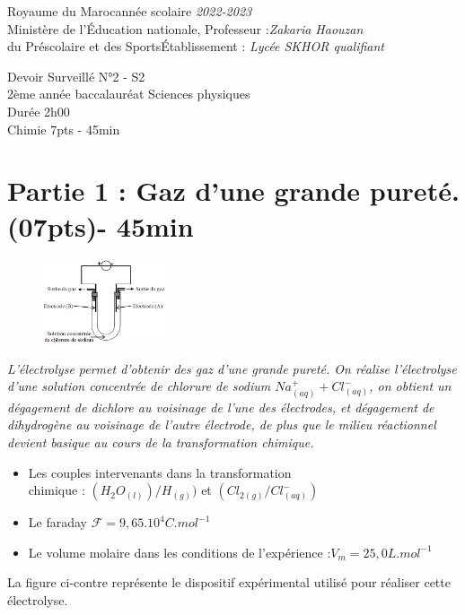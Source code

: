 \documentclass[12pt]{article}
\newcommand\headerMe[2]{\noindent{}#1\hfill#2}
\begin{document}
\headerMe{Royaume du Maroc}{année scolaire \emph{2022-2023}}\\
\headerMe{Ministère de l'Éducation nationale, }{  Professeur :\emph{Zakaria Haouzan}}\\
\headerMe{du Préscolaire et des Sports}{Établissement : \emph{Lycée SKHOR qualifiant}}\\
\begin{center}
Devoir Surveillé  N°2 - S2 \\
    2ème année baccalauréat Sciences physiques\\
Durée 2h00
\\
    \vspace{.2cm}
\hrulefill
\Large{Chimie 7pts - 45min}
\hrulefill\\

\end{center}

 \section*{Partie 1 : Gaz d’une grande pureté. \dotfill(07pts)- 45min }
\begin{figure}
  \begin{center}
	  \vspace{-0.6cm}
	\includegraphics[width=0.32\textwidth]{./img/ex00.png}
  \end{center}
\end{figure}
	   \emph{L'électrolyse permet d'obtenir des gaz d'une grande pureté.
On réalise l'électrolyse d'une solution concentrée de chlorure de sodium
$Na^+_{(aq)} + Cl^-_{(aq)}$, on obtient un dégagement de dichlore au voisinage de l’une des
électrodes, et dégagement de dihydrogène au voisinage de l'autre électrode, de plus
que le milieu réactionnel \\devient basique au cours de la transformation chimique.}

\begin{itemize}
	\item Les couples intervenants dans la transformation\\ chimique : $(H_2O_{(l)})/H_{(g)})$ et $(Cl_{2(g)}/Cl^-_{(aq)})$
	\item Le faraday $\mathscr{F}=9,65.10^4 C.mol^{-1}$
	\item Le volume molaire dans les conditions de l’expérience :$V_m = 25,0L.mol^{-1}$
\end{itemize}
La figure ci-contre représente le
dispositif expérimental utilisé pour
réaliser cette électrolyse.
\end{document}
